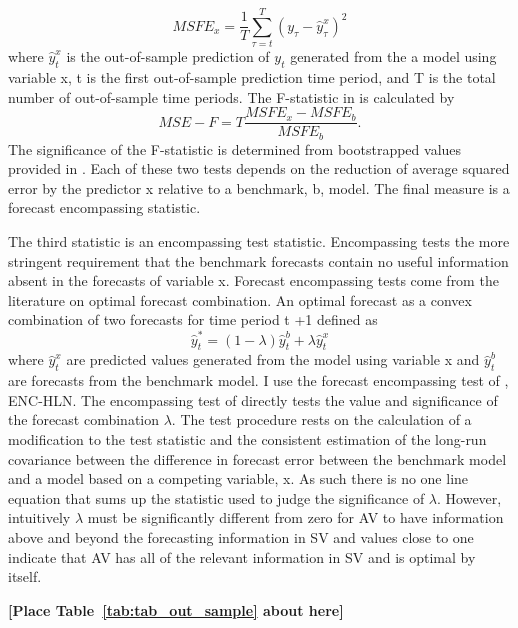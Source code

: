 \begin{equation} \label{eq:msfe}
	MSFE_{x} = \frac{1}{T} \sum_{\tau=t}^{T} (y_{\tau} - \hat{y}^{x}_{\tau})^{2}
\end{equation}
where $\hat{y}^{x}_{t}$ is the out-of-sample prediction of $y_{t}$ generated from the a model using variable x, t is the first out-of-sample prediction time period, and T is the total number of out-of-sample time periods. The F-statistic in \citet{mccracken_asymptotics_2007} is calculated by
\begin{equation} \label{eq:mse-f}
MSE-F = T \frac{MSFE_{x}-MSFE_{b}}{MSFE_{b}}.
\end{equation}
The significance of the F-statistic is determined from bootstrapped values provided in \citet{mccracken_asymptotics_2007}.
Each of these two tests depends on the reduction of average squared error by the predictor x relative to a benchmark, b, model. The final measure is a forecast encompassing statistic. 

The third statistic is an encompassing test statistic. Encompassing tests the more stringent requirement that the benchmark forecasts contain no useful information absent in the forecasts of variable x. Forecast encompassing tests come from the literature on optimal forecast combination. \citep{Chong1986,Fair1990} An optimal forecast as a convex combination of two forecasts for time period t +1 defined as
\begin{equation} \label{eq:forecast_comb}
\hat y^{*}_{t} = (1-\lambda)\hat y^{b}_{t} + \lambda \hat y^{x}_{t}
\end{equation}
where $\hat y^{x}_{t}$ are predicted values generated from the model using variable x and $\hat y^{b}_{t}$ are forecasts from the benchmark model. I use the forecast encompassing test of \citet{harvey_tests_1998}, ENC-HLN.
The encompassing test of \citet{harvey_tests_1998} directly tests the value and significance of the forecast combination $\lambda$. The test procedure rests on the calculation of a modification to the \citet{Diebold1995} test statistic and the consistent estimation of the long-run covariance between the difference in forecast error between the benchmark model and a model based on a competing variable, x. As such there is no one line equation that sums up the statistic used to judge the significance of $\lambda$. However, intuitively $\lambda$ must be significantly different from zero for AV to have information above and beyond the forecasting information in SV and values close to one indicate that AV has all of the relevant information in SV and is optimal by itself.
\bigskip
\centerline{\bf [Place Table~\ref{tab:tab_out_sample} about here]}
\bigskip

